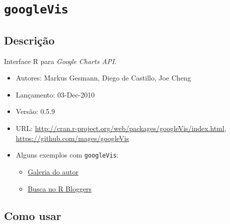 \section{\texttt{googleVis}}


\subsection*{Descrição}

\begin{frame}

  Interface R para \emph{Google Charts API}.

  \begin{itemize}
  \item Autores: Markus Gesmann, Diego de Castillo, Joe Cheng
  \item Lançamento: 03-Dec-2010
  \item Versão: 0.5.9
  \item URL:
    \url{http://cran.r-project.org/web/packages/googleVis/index.html},
    \url{https://github.com/mages/googleVis}
  \item Alguns exemplos com \texttt{googleVis}:
    \begin{itemize}
      
    \item
      \href{http://cran.r-project.org/web/packages/googleVis/vignettes/googleVis_examples.html}{Galeria
        do autor}
    \item \href{http://www.r-bloggers.com/?s=googleVis}{Busca no R
        Bloggers}
    \end{itemize}
  \end{itemize}
  
\end{frame}


\subsection*{Como usar}

\begin{frame}
  

  
\end{frame}


